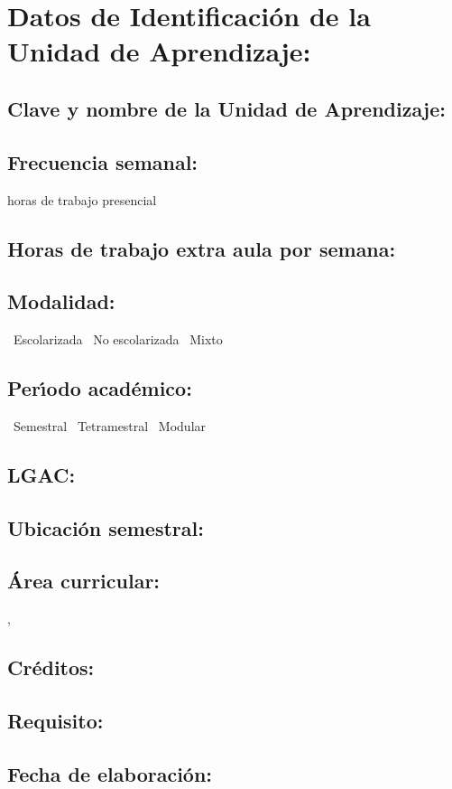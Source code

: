 \documentclass[10 pt]{article}
\begin{document}


\section{Datos de Identificaci\'{o}n de la Unidad de Aprendizaje:}
\subsection{Clave y nombre de la Unidad de Aprendizaje:} 
\subsection{Frecuencia semanal:} horas de trabajo presencial 
\subsection{Horas de trabajo extra aula por semana:} 
\subsection{Modalidad:} \yes~Escolarizada \no~No escolarizada \no~Mixto
\subsection{Per\'{\i}odo acad\'{e}mico:} \yes~Semestral
\no~Tetramestral \no~Modular
\subsection{LGAC:} \underline{\seys}
\subsection{Ubicaci\'{o}n semestral:} 
\subsection{\'{A}rea curricular:} \underline{\fr, \le}
\subsection{Cr\'{e}ditos:} 
\subsection{Requisito:} 
\subsection{Fecha de elaboraci\'{o}n:} 
\end{document}
